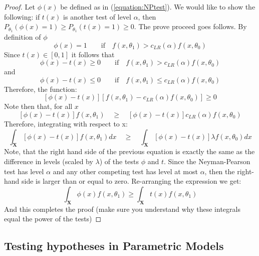 \documentclass[11pt]{article} %
\begin{document}
\begin{proof}
Let $\phi(x)$ be defined as in (\ref{equation:NPtest}). We would like to show the following: if $t(x)$ is another test of level $\alpha$, then $P_{\theta_1} (\phi(x)=1) \geq P_{\theta_1} (t(x)=1) \geq 0$. The prove proceed goes follows. By definition of $\phi$
\begin{equation*}
\phi(x)=1 \quad\quad \text{if}  \quad f(x, \theta_1) > c_{LR}(\alpha) f(x, \theta_0)
 \end{equation*} 
Since $t(x) \in [0,1]$ it follows that 
\begin{equation*}
\phi(x) - t(x) \geq 0 \quad\quad \text{if}  \quad f(x, \theta_1) > c_{LR}(\alpha) f(x, \theta_0)
 \end{equation*} 
 and
 \begin{equation*}
\phi(x) - t(x) \leq 0 \quad\quad \text{if}  \quad f(x, \theta_1) \leq c_{LR}(\alpha) f(x, \theta_0)
 \end{equation*} 
 Therefore, the function:
 \begin{equation*}
\left[ \phi(x)-t(x) \right] \left[ f(x, \theta_1) - c_{LR}(\alpha) f(x, \theta_0) \right] \geq 0
 \end{equation*}
 Note then that, for all $x$
 \begin{equation*}
 \left[ \phi(x)-t(x) \right] f(x, \theta_1) \quad \geq  \quad \left[ \phi(x)-t(x) \right] c_{LR}(\alpha) f(x, \theta_0) 
 \end{equation*}
 Therefore, integrating with respect to x:
  \begin{equation*}
\int_{\mathbf{X}} \left[ \phi(x)-t(x) \right] f(x, \theta_1)dx \quad \geq  \quad \int_{\mathbf{X}}\left[ \phi(x)-t(x) \right] \lambda f(x, \theta_0) dx
 \end{equation*}
 Note, that the right hand side of the previous equation is exactly the same as the difference in levels (scaled by $\lambda$) of the tests $\phi$ and $t$. Since the Neyman-Pearson test has level $\alpha$ and any other competing test has level at most $\alpha$, then the right-hand side is larger than or equal to zero.  Re-arranging the expression we get:
 \begin{equation*}
 \int_{\mathbf{X}} \phi(x) f(x, \theta_1) \geq  \int_{\mathbf{X}} t(x) f(x, \theta_1)
 \end{equation*}
 And this completes the proof (make sure you understand why these integrals equal the power of the tests)
\end{proof}

\subsection{Testing hypotheses in Parametric Models}
\end{document}

